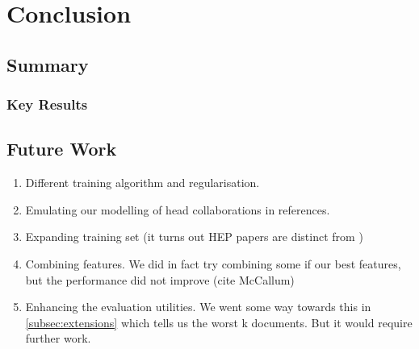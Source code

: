 
\chapter{Conclusion} %

\label{Chapter6} %



\section{Summary}

\subsection{Key Results}

\section{Future Work}
\label{sec:futurework}
\begin{enumerate}
\item Different training algorithm and regularisation.
\item Emulating our modelling of head collaborations in references.
\item Expanding training set (it turns out HEP papers are distinct from )
\item Combining features. We did in fact try combining some if our best features, but the performance did not improve (cite McCallum)
\item Enhancing the evaluation utilities. We went some way towards this in \ref{subsec:extensions} which tells us the worst k documents. But it would require further work.
\end{enumerate}
